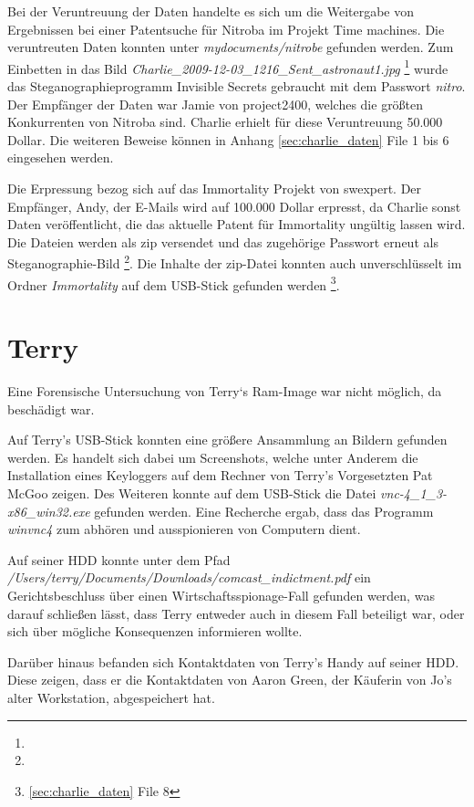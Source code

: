 Bei der Veruntreuung der Daten handelte es sich um die Weitergabe von Ergebnissen bei einer Patentsuche für
Nitroba im Projekt Time machines. Die veruntreuten Daten konnten unter \textit{mydocuments/nitrobe} gefunden
werden. Zum Einbetten in das Bild \textit{Charlie_2009-12-03_1216_Sent_astronaut1.jpg}
\footnote{} wurde das Steganographieprogramm Invisible Secrets gebraucht mit dem Passwort \textit{nitro}. Der Empfänger der Daten war Jamie von project2400, welches die größten Konkurrenten von Nitroba sind. Charlie erhielt für diese Veruntreuung 50.000 Dollar. Die weiteren Beweise können in Anhang \ref{sec:charlie_daten} File 1 bis 6 eingesehen werden.

Die Erpressung bezog sich auf das Immortality Projekt von swexpert. Der Empfänger, Andy, der E-Mails wird auf
100.000 Dollar erpresst, da Charlie sonst Daten veröffentlicht, die das aktuelle Patent für Immortality
ungültig lassen wird. Die Dateien werden als zip versendet und das zugehörige Passwort erneut als
Steganographie-Bild \footnote{}. Die Inhalte der zip-Datei konnten auch
unverschlüsselt im Ordner \textit{Immortality} auf dem USB-Stick gefunden werden \footnote{\ref{sec:charlie_daten} File 8}.

\section{Terry}
\label{sec:terry}
Eine Forensische Untersuchung von Terry`s Ram-Image war nicht möglich, da beschädigt war.

Auf Terry's USB-Stick konnten eine größere Ansammlung an Bildern gefunden werden. Es handelt sich dabei um Screenshots, welche unter Anderem die Installation eines Keyloggers auf dem Rechner von Terry's Vorgesetzten Pat McGoo zeigen. Des Weiteren konnte auf dem USB-Stick die Datei \textit{vnc-4_1_3-x86_win32.exe} gefunden werden. Eine Recherche ergab, dass das Programm \textit{winvnc4} zum abhören und ausspionieren von Computern dient.

Auf seiner HDD konnte unter dem Pfad \textit{/Users/terry/Documents/Downloads/comcast_indictment.pdf} ein Gerichtsbeschluss über einen Wirtschaftsspionage-Fall gefunden werden, was darauf schließen lässt, dass Terry entweder auch in diesem Fall beteiligt war, oder sich über mögliche Konsequenzen informieren wollte.\newline

Darüber hinaus befanden sich Kontaktdaten von Terry's Handy auf seiner HDD. Diese zeigen, dass er die Kontaktdaten von Aaron Green, der Käuferin von Jo's alter Workstation, abgespeichert hat.

